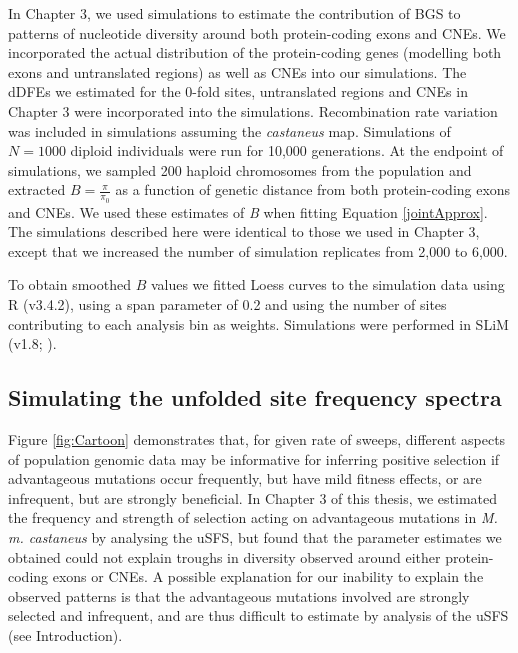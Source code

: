  	In Chapter 3, we used simulations to estimate the contribution of BGS to patterns of nucleotide diversity around both protein-coding exons and CNEs. We incorporated the actual distribution of the protein-coding genes (modelling both exons and untranslated regions) as well as CNEs into our simulations. The dDFEs we estimated for the 0-fold sites, untranslated regions and CNEs in Chapter 3 were incorporated into the simulations. Recombination rate variation was included in simulations assuming the \textit{castaneus} map. Simulations of $N = 1000$ diploid individuals were run for 10,000 generations. At the endpoint of simulations, we sampled 200 haploid chromosomes from the population and extracted $B = \frac{\pi}{\pi_0}$ as a function of genetic distance from both protein-coding exons and CNEs. We used these estimates of \textit{B} when fitting Equation \ref{jointApprox}. The simulations described here were identical to those we used in Chapter 3, except that we increased the number of simulation replicates from 2,000 to 6,000. 
 	
 	To obtain smoothed $B$ values we fitted Loess curves to the simulation data using R (v3.4.2), using a span parameter of 0.2 and using the number of sites contributing to each analysis bin as weights. Simulations were performed in SLiM (v1.8; \citealt{RN148}). 

	\subsection{Simulating the unfolded site frequency spectra}
	
	Figure \ref{fig:Cartoon} demonstrates that, for given rate of sweeps, different aspects of population genomic data may be informative for inferring positive selection if advantageous mutations occur frequently, but have mild fitness effects, or are infrequent, but are strongly beneficial. In Chapter 3 of this thesis, we estimated the frequency and strength of selection acting on advantageous mutations in \textit{M. m. castaneus} by analysing the uSFS, but found that the parameter estimates we obtained could not explain troughs in diversity observed around either protein-coding exons or CNEs. A possible explanation for our inability to explain the observed patterns is that the advantageous mutations involved are strongly selected and infrequent, and are thus difficult to estimate by analysis of the uSFS (see Introduction).
		
